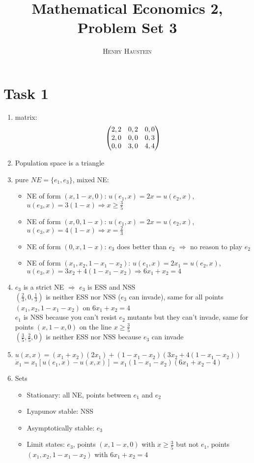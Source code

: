 \documentclass{article}
\title{\textbf{Mathematical Economics 2, Problem Set 3}}
\author{\textsc{Henry Haustein}}
\date{}
\begin{document}
	\maketitle
	
	\section*{Task 1}
	\begin{enumerate}[label=(\alph*)]
		\item matrix:
		\begin{align}
			\begin{pmatrix}
				2,2 & 0,2 & 0,0 \\
				2,0 & 0,0 & 0,3 \\
				0,0 & 3,0 & 4,4
			\end{pmatrix} \notag
		\end{align}
		\item Population space is a triangle
		\item pure $NE = \{e_1,e_3\}$, mixed NE:
		\begin{itemize}
			\item NE of form $(x,1-x,0)$: $u(e_1,x) = 2x = u(e_2,x)$, $u(e_3,x) = 3(1-x) \Rightarrow x\ge \frac{3}{5}$
			\item NE of form $(x,0,1-x)$: $u(e_1,x) = 2x = u(e_2,x)$, $u(e_3,x) = 4(1-x) \Rightarrow x= \frac{2}{3}$
			\item NE of form $(0,x,1-x)$: $e_3$ does better than $e_2$ $\Rightarrow$ no reason to play $e_2$
			\item NE of form $(x_1,x_2,1-x_1-x_2)$: $u(e_1,x) = 2x_1 = u(e_2,x)$, $u(e_3,x) = 3x_2 + 4(1-x_1-x_2) \Rightarrow 6x_1+x_2 = 4$
		\end{itemize}
		\item $e_3$ is a strict NE $\Rightarrow$ $e_3$ is ESS and NSS \\
		$\left(\frac{2}{3},0,\frac{1}{3}\right)$ is neither ESS nor NSS ($e_3$ can invade), same for all points $(x_1,x_2,1-x_1-x_2)$ on $6x_1+x_2=4$ \\
		$e_1$ is NSS because you can't resist $e_2$ mutants but they can't invade, same for points $(x,1-x,0)$ on the line $x\ge \frac{3}{5}$ \\
		$\left(\frac{3}{5},\frac{2}{5},0\right)$ is neither ESS nor NSS because $e_3$ can invade
		\item $u(x,x) = (x_1+x_2)(2x_1) + (1-x_1-x_2)(3x_2 + 4(1-x_1-x_2))$ \\
		$\dot{x}_1 = x_1[u(e_1,x) - u(x,x)] = x_1(1-x_1-x_2)(6x_1+x_2-4)$
		\item Sets
		\begin{itemize}
			\item Stationary: all NE, points between $e_1$ and $e_2$
			\item Lyapunov stable: NSS
			\item Asymptotically stable: $e_3$
			\item Limit states: $e_3$, points $(x,1-x,0)$ with $x\ge \frac{3}{5}$ but not $e_1$, points $(x_1,x_2,1-x_1-x_2)$ with $6x_1+x_2=4$
		\end{itemize}
	\end{enumerate}
\end{document}
